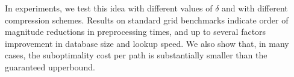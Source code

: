 In experiments, we test this idea with different values of $\delta$ and 
with different compression schemes.
Results on standard grid benchmarks indicate order
of magnitude reductions in preprocessing times, and up to several factors
improvement in database size and lookup speed. We also show that, in many 
cases, the suboptimality cost per path is substantially smaller than the 
guaranteed upperbound.
%
%
%
%
%
%
